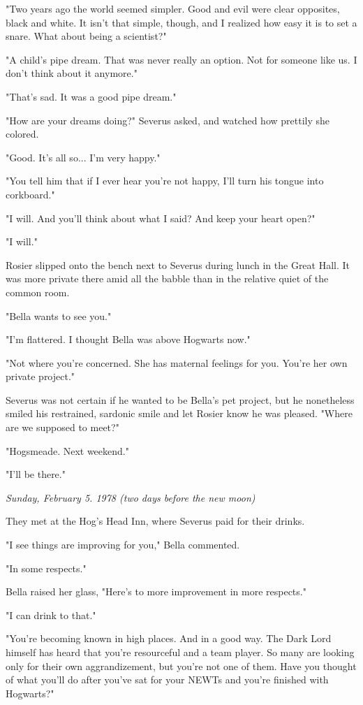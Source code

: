 \documentclass[a4paper,11pt]{article}
\begin{document}
"Two years ago the world seemed simpler. Good and evil were clear opposites, black and white. It isn't that simple, though, and I realized how easy it is to set a snare. What about being a scientist?"

"A child's pipe dream. That was never really an option. Not for someone like us. I don't think about it anymore."

"That's sad. It was a good pipe dream."

"How are your dreams doing?" Severus asked, and watched how prettily she colored.

"Good. It's all so... I'm very happy."

"You tell him that if I ever hear you're not happy, I'll turn his tongue into corkboard."

"I will. And you'll think about what I said? And keep your heart open?"

"I will."

Rosier slipped onto the bench next to Severus during lunch in the Great Hall. It was more private there amid all the babble than in the relative quiet of the common room.

"Bella wants to see you."

"I'm flattered. I thought Bella was above Hogwarts now."

"Not where you're concerned. She has maternal feelings for you. You're her own private project."

Severus was not certain if he wanted to be Bella's pet project, but he nonetheless smiled his restrained, sardonic smile and let Rosier know he was pleased. "Where are we supposed to meet?"

"Hogsmeade. Next weekend."

"I'll be there."

\emph{Sunday, February 5. 1978 (two days before the new moon)}

They met at the Hog's Head Inn, where Severus paid for their drinks.

"I see things are improving for you," Bella commented.

"In some respects."

Bella raised her glass, "Here's to more improvement in more respects."

"I can drink to that."

"You're becoming known in high places. And in a good way. The Dark Lord himself has heard that you're resourceful and a team player. So many are looking only for their own aggrandizement, but you're not one of them. Have you thought of what you'll do after you've sat for your NEWTs and you're finished with Hogwarts?"
\end{document}
